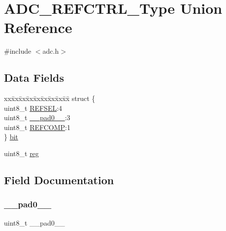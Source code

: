 \hypertarget{union_a_d_c___r_e_f_c_t_r_l___type}{}\section{A\+D\+C\+\_\+\+R\+E\+F\+C\+T\+R\+L\+\_\+\+Type Union Reference}
\label{union_a_d_c___r_e_f_c_t_r_l___type}


{\ttfamily \#include $<$adc.\+h$>$}

\subsection*{Data Fields}
\begin{DoxyCompactItemize}
\item 
\begin{tabbing}
xx\=xx\=xx\=xx\=xx\=xx\=xx\=xx\=xx\=\kill
struct \{\\
\>uint8\_t \mbox{\hyperlink{union_a_d_c___r_e_f_c_t_r_l___type_a31386ac97a08a22e5f39b0481794d58a}{REFSEL}}:4\\
\>uint8\_t \mbox{\hyperlink{union_a_d_c___r_e_f_c_t_r_l___type_a8b4eebe79ded0459acec2f4950102ba3}{\_\_pad0\_\_}}:3\\
\>uint8\_t \mbox{\hyperlink{union_a_d_c___r_e_f_c_t_r_l___type_afe9dd195158ff7a303b3b3b536f0dbe0}{REFCOMP}}:1\\
\} \mbox{\hyperlink{union_a_d_c___r_e_f_c_t_r_l___type_a7c6c5b84734b683cc24fc03b56729c66}{bit}}\\

\end{tabbing}\item 
uint8\+\_\+t \mbox{\hyperlink{union_a_d_c___r_e_f_c_t_r_l___type_a9428adc9af4653a2050e2536b55dec8d}{reg}}
\end{DoxyCompactItemize}


\subsection{Field Documentation}
\mbox{\label{union_a_d_c___r_e_f_c_t_r_l___type_a8b4eebe79ded0459acec2f4950102ba3}} 
\subsubsection{\texorpdfstring{\_\_pad0\_\_}{\_\_pad0\_\_}}
{\footnotesize\ttfamily uint8\+\_\+t \+\_\+\+\_\+pad0\+\_\+\+\_\+}

